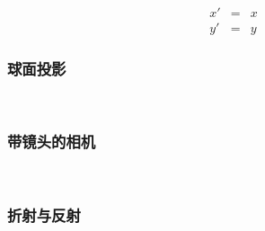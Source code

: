 \documentclass{beamer}
\begin{document}
{{{{\begin{frame}
  \
  
  
  \begin{eqnarray*}
    x' & = & x\\
    y' & = & y
  \end{eqnarray*}
\end{frame}}{\begin{frame}
  \frametitle{球面投影}
  
  \
  
  {\hspace{3em}}
\end{frame}}{\begin{frame}
  \frametitle{带镜头的相机}
  
  \
  
  {\hspace{4em}}
\end{frame}}{\begin{frame}
  \frametitle{折射与反射}
  

\end{frame}}}}}
\end{document}
